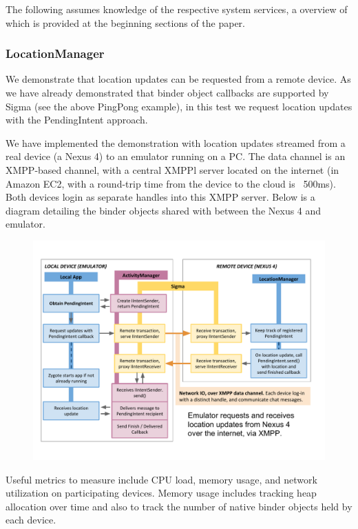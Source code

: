 \documentclass[prodmode]{acmlarge}
\begin{document}
The following assumes knowledge of the respective system services, a overview of which is provided at the beginning sections of the paper.

\subsubsection{LocationManager}
We demonstrate that location updates can be requested from a remote device. As we have already demonstrated that binder object callbacks are supported by Sigma (see the above PingPong example), in this test we request location updates with the PendingIntent approach.

We have implemented the demonstration with location updates streamed from a real device (a Nexus 4) to an emulator running on a PC. The data channel is an XMPP-based channel, with a central XMPPl server located on the internet (in Amazon EC2, with a round-trip time from the device to the cloud is ~500ms). Both devices login as separate handles into this XMPP server.
Below is a diagram detailing the binder objects shared with between the Nexus 4 and emulator.

\begin{figure}
\centering
\includegraphics[width=\textwidth]{drawings/LocationPendingIntentExample.pdf}
\end{figure}

Useful metrics to measure include CPU load, memory usage, and network utilization on participating devices. Memory usage includes tracking heap allocation over time and also to track the number of native binder objects held by each device. 
\end{document}
